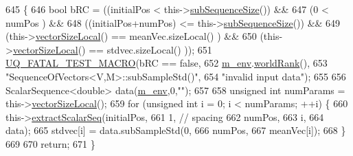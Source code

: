 \begin{DoxyCode}
645 \{
646   \textcolor{keywordtype}{bool} bRC = ((initialPos              <  this->\hyperlink{class_q_u_e_s_o_1_1_sequence_of_vectors_a0224bd3e961d86af5d2886301c0c2b86}{subSequenceSize}()) &&
647               (0                       <  numPos                 ) &&
648               ((initialPos+numPos)     <= this->\hyperlink{class_q_u_e_s_o_1_1_sequence_of_vectors_a0224bd3e961d86af5d2886301c0c2b86}{subSequenceSize}()) &&
649               (this->\hyperlink{class_q_u_e_s_o_1_1_base_vector_sequence_a2fefedf9e5b90f22881103b3f92555f6}{vectorSizeLocal}() == meanVec.sizeLocal()    ) &&
650               (this->\hyperlink{class_q_u_e_s_o_1_1_base_vector_sequence_a2fefedf9e5b90f22881103b3f92555f6}{vectorSizeLocal}() == stdvec.sizeLocal()     ));
651   \hyperlink{_defines_8h_a56d63d18d0a6d45757de47fcc06f574d}{UQ\_FATAL\_TEST\_MACRO}(bRC == \textcolor{keyword}{false},
652                       \hyperlink{class_q_u_e_s_o_1_1_base_vector_sequence_a8e8824d2a63c5a43bcc6473e3a0491e8}{m\_env}.\hyperlink{class_q_u_e_s_o_1_1_base_environment_a78b57112bbd0e6dd0e8afec00b40ffa7}{worldRank}(),
653                       \textcolor{stringliteral}{"SequenceOfVectors<V,M>::subSampleStd()"},
654                       \textcolor{stringliteral}{"invalid input data"});
655 
656   ScalarSequence<double> data(\hyperlink{class_q_u_e_s_o_1_1_base_vector_sequence_a8e8824d2a63c5a43bcc6473e3a0491e8}{m\_env},0,\textcolor{stringliteral}{""});
657 
658   \textcolor{keywordtype}{unsigned} \textcolor{keywordtype}{int} numParams = this->\hyperlink{class_q_u_e_s_o_1_1_base_vector_sequence_a2fefedf9e5b90f22881103b3f92555f6}{vectorSizeLocal}();
659   \textcolor{keywordflow}{for} (\textcolor{keywordtype}{unsigned} \textcolor{keywordtype}{int} i = 0; i < numParams; ++i) \{
660     this->\hyperlink{class_q_u_e_s_o_1_1_sequence_of_vectors_ac977b3b26a6af2ae727671f1246262fd}{extractScalarSeq}(initialPos,
661                            1, \textcolor{comment}{// spacing}
662                            numPos,
663                            i,
664                            data);
665     stdvec[i] = data.subSampleStd(0,
666                                   numPos,
667                                   meanVec[i]);
668   \}
669 
670   \textcolor{keywordflow}{return};
671 \}
\end{DoxyCode}
